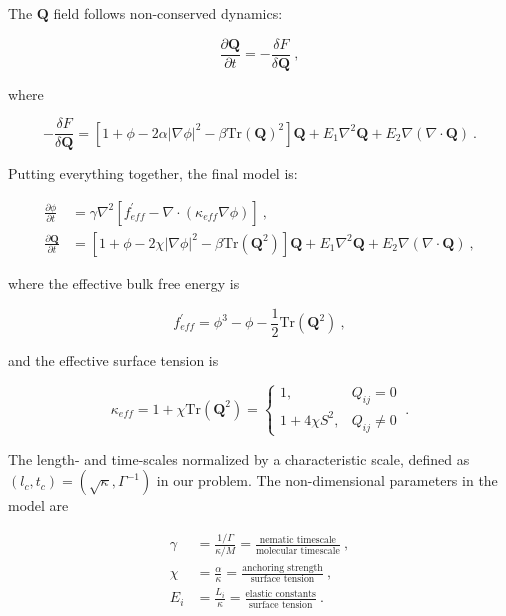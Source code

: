 \documentclass[a4paper,11pt]{custom}
\begin{document}
The \(\mathbf{Q}\) field follows non-conserved dynamics:

\begin{equation}
  \frac{\partial \mathbf{Q}}{\partial t} = -\frac{\delta F}{\delta \mathbf{Q}} \ ,
\end{equation}

where

\begin{equation}
  -\frac{\delta F}{\delta\mathbf{Q}} = [1 + \phi - 2\alpha|\nabla\phi|^2 - \beta \mathrm{Tr}(\mathbf{Q})^2]\mathbf{Q} + E_1 \nabla^2\mathbf{Q} + E_2\nabla(\nabla\cdot\mathbf{Q}) \ .
\end{equation}

Putting everything together, the final model is:

\begin{align}
	\frac{\partial \phi}{\partial t} &= \gamma\nabla^2[f^\prime_{eff} - \nabla\cdot(\kappa_{eff}\nabla\phi)] \ , \\
	\frac{\partial \mathbf{Q}}{\partial t} &= [1 + \phi - 2\chi|\nabla\phi|^2 - \beta\mathrm{Tr}(\mathbf{Q}^2)]\mathbf{Q} + E_1\nabla^2\mathbf{Q} + E_2\nabla(\nabla\cdot\mathbf{Q}) \ ,
\end{align}

where the effective bulk free energy is

\begin{equation}
	f^\prime_{eff} = \phi^3 - \phi - \frac{1}{2}\mathrm{Tr}(\mathbf{Q}^2) \ ,
\end{equation}

and the effective surface tension is

\begin{equation}
	\kappa_{eff} = 1 + \chi\mathrm{Tr}(\mathbf{Q}^2) = 
	\begin{cases}
   		1, & Q_{ij} = 0 \\
   		1 + 4\chi S^2, & Q_{ij} \neq 0
	\end{cases} \ .
\end{equation}

The length- and time-scales normalized by a characteristic scale, defined as \((l_c, t_c) = (\sqrt{\kappa}, \Gamma^{-1})\) in our problem. The non-dimensional parameters in the model are

\begin{align*}
	\gamma &= \frac{1/\Gamma}{\kappa/M} = \frac{\text{nematic timescale}}{\text{molecular timescale}} \ , \\
	\chi &= \frac{\alpha}{\kappa} = \frac{\text{anchoring strength}}{\text{surface tension}} \ , \\
	E_i &= \frac{L_i}{\kappa} = \frac{\text{elastic constants}}{\text{surface tension}} \ .
\end{align*}
\end{document}
